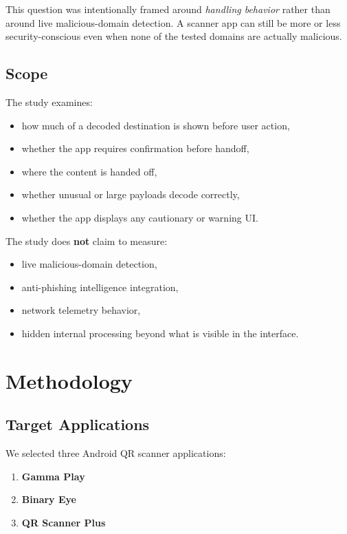 \documentclass[11pt]{article}
\begin{document}
This question was intentionally framed around \emph{handling behavior} rather than around live malicious-domain detection. A scanner app can still be more or less security-conscious even when none of the tested domains are actually malicious.

\subsection{Scope}

The study examines:
\begin{itemize}[leftmargin=1.5em]
    \item how much of a decoded destination is shown before user action,
    \item whether the app requires confirmation before handoff,
    \item where the content is handed off,
    \item whether unusual or large payloads decode correctly,
    \item whether the app displays any cautionary or warning UI.
\end{itemize}

The study does \textbf{not} claim to measure:
\begin{itemize}[leftmargin=1.5em]
    \item live malicious-domain detection,
    \item anti-phishing intelligence integration,
    \item network telemetry behavior,
    \item hidden internal processing beyond what is visible in the interface.
\end{itemize}

\section{Methodology}

\subsection{Target Applications}

We selected three Android QR scanner applications:
\begin{enumerate}[leftmargin=1.5em]
    \item \textbf{Gamma Play}
    \item \textbf{Binary Eye}
    \item \textbf{QR Scanner Plus}
\end{enumerate}
\end{document}
